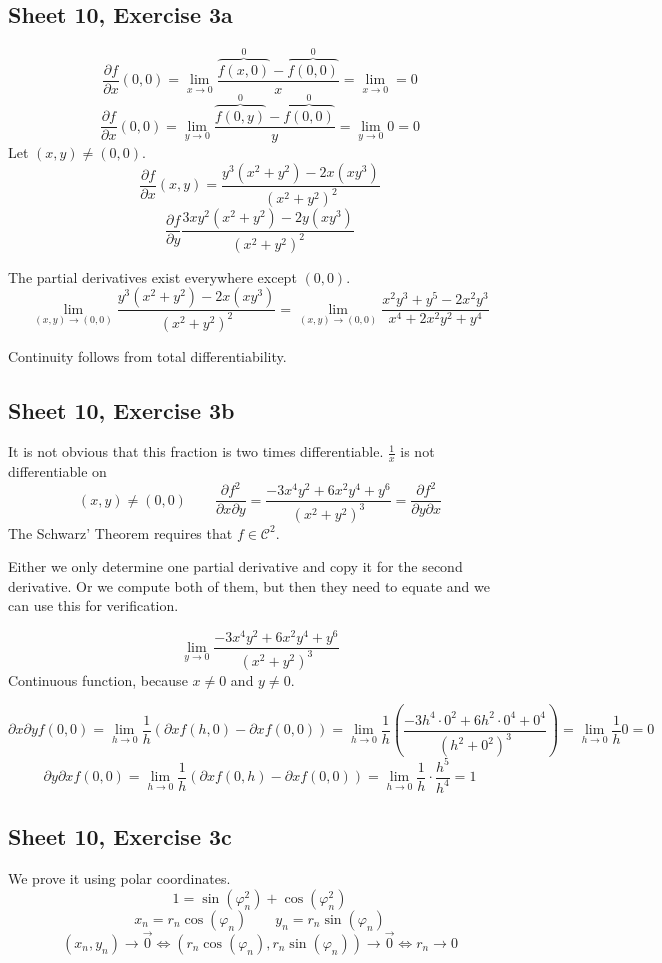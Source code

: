 \documentclass{article}
\begin{document}
\subsection{Sheet 10, Exercise 3a}
\[ \frac{\partial f}{\partial x} (0, 0) = \lim_{x \to 0} \frac{\overbrace{f(x, 0)}^{0} - \overbrace{f(0, 0)}^{0}}{x} = \lim_{x \to 0} = 0 \]
\[ \frac{\partial f}{\partial x} (0, 0) = \lim_{y \to 0} \frac{\overbrace{f(0, y)}^{0} - \overbrace{f(0, 0)}^{0}}{y} = \lim_{y \to 0} 0 = 0 \]
Let $(x, y) \neq (0, 0)$.
\[ \frac{\partial f}{\partial x} (x, y) = \frac{y^3 (x^2 + y^2) - 2x (xy^3)}{(x^2 + y^2)^2} \]
\[ \frac{\partial f}{\partial y} \frac{3xy^2 (x^2 + y^2) - 2y (xy^3)}{(x^2 + y^2)^2} \]

The partial derivatives exist everywhere except $(0, 0)$.
\[ \lim_{(x,y) \to (0,0)} \frac{y^3 (x^2 + y^2) - 2x (xy^3)}{(x^2 + y^2)^2} = \lim_{(x,y)\to(0, 0)} \frac{x^2 y^3 + y^5 - 2x^2 y^3}{x^4 + 2x^2 y^2 + y^4} \]

Continuity follows from total differentiability.

\subsection{Sheet 10, Exercise 3b}
It is not obvious that this fraction is two times differentiable. $\frac1{x}$ is not differentiable on 
\[ (x, y) \neq (0, 0) \qquad \frac{\partial f^2}{\partial x \partial y} = \frac{-3x^4 y^2 + 6x^2 y^4 + y^6}{(x^2 + y^2)^3} = \frac{\partial f^2}{\partial y \partial x} \]
The Schwarz' Theorem requires that $f \in \mathcal C^2$.

Either we only determine one partial derivative and copy it for the second derivative.
Or we compute both of them, but then they need to equate and we can use this for verification.

\[ \lim_{y \to 0} \frac{-3x^4 y^2 + 6x^2 y^4 + y^6}{(x^2 + y^2)^3} \]
Continuous function, because $x \neq 0$ and $y \neq 0$.

\[ \partial x \partial y f(0, 0) = \lim_{h \to 0} \frac{1}{h} (\partial x f(h, 0) - \partial x f(0, 0)) = \lim_{h\to 0} \frac{1}{h} \left(\frac{-3 h^4 \cdot 0^2 + 6 h^2 \cdot 0^4 + 0^4}{(h^2 + 0^2)^3}\right) = \lim_{h\to0} \frac1h 0 = 0 \]
\[ \partial y \partial x f(0, 0) = \lim_{h \to 0} \frac1h (\partial x f(0, h) - \partial x f(0, 0)) = \lim_{h\to 0} \frac1h \cdot \frac{h^5}{h^4} = 1 \]

\subsection{Sheet 10, Exercise 3c}
We prove it using polar coordinates.
\[ 1 = \sin(\varphi_n^2) + \cos(\varphi_n^2) \]
\[ x_n = r_n \cos(\varphi_n) \qquad y_n = r_n \sin(\varphi_n) \]
\[ (x_n, y_n) \to \vec 0 \iff (r_n \cos(\varphi_n), r_n \sin(\varphi_n)) \to \vec 0 \iff r_n \to 0 \]
\end{document}
